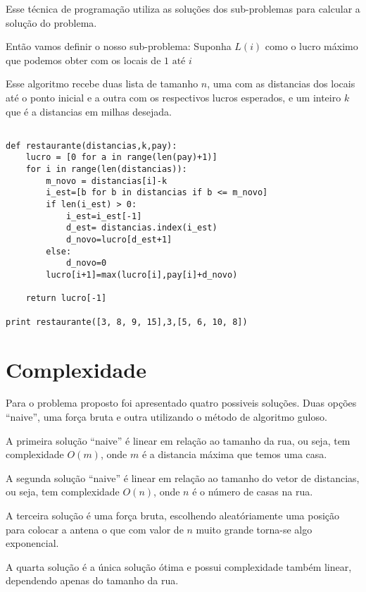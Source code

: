 \documentclass[11pt]{article}
\begin{document}
Esse técnica de programação utiliza as soluções dos sub-problemas para calcular a solução do problema.

Então vamos definir o nosso sub-problema: Suponha $L(i)$ como o lucro máximo que podemos obter com os locais de $1 \text{ até } i$   



Esse algoritmo recebe duas lista de tamanho $n$, uma com as distancias dos locais até o ponto inicial e a outra com os respectivos lucros esperados, e um inteiro $k$ que é a distancias em milhas desejada.

\begin{verbatim}

def restaurante(distancias,k,pay):
    lucro = [0 for a in range(len(pay)+1)]
    for i in range(len(distancias)):
        m_novo = distancias[i]-k
        i_est=[b for b in distancias if b <= m_novo]
        if len(i_est) > 0:
            i_est=i_est[-1]
            d_est= distancias.index(i_est)
            d_novo=lucro[d_est+1]
        else:
            d_novo=0
        lucro[i+1]=max(lucro[i],pay[i]+d_novo)

    return lucro[-1]

print restaurante([3, 8, 9, 15],3,[5, 6, 10, 8])

\end{verbatim}





\section{Complexidade}
\label{sec-5}

Para o problema proposto foi apresentado quatro possiveis soluções. Duas opções ``naive'', uma força bruta e outra utilizando o 
método de algoritmo guloso.

A primeira solução ``naive'' é linear em relação ao tamanho da rua, ou seja, tem complexidade $O(m)$, onde $m$ é a distancia máxima 
que temos uma casa.

A segunda solução ``naive'' é linear em relação ao tamanho do vetor de distancias, ou seja, tem complexidade $O(n)$, onde $n$ é o número
de casas na rua.

A terceira solução é uma força bruta, escolhendo aleatóriamente uma posição para colocar a antena o que com valor de $n$ muito grande 
torna-se algo exponencial.

A quarta solução é a única solução ótima e possui complexidade também linear, dependendo apenas do tamanho da rua.
\end{document}
